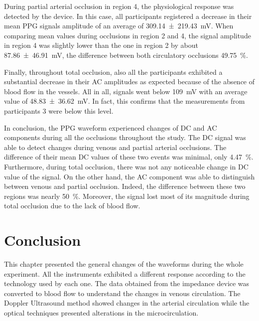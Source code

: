 During partial arterial occlusion in region 4, the physiological response was detected by the device. In this case, all participants registered a decrease in their mean PPG signals amplitude of an average of \SI{309.14(21943)}{\milli\volt}. When comparing mean values during occlusions in region 2 and 4, the signal amplitude in region 4 was slightly lower than the one in region 2 by about \SI{87.86(4691)}{\milli\volt}, the difference between both circulatory occlusions \SI{49.75}{\percent}.

Finally, throughout total occlusion, also all the participants exhibited a substantial decrease in their AC amplitudes as expected because of the absence of blood flow in the vessels. All in all, signals went below \SI{109}{\milli\volt} with an average value of \SI{48.83(3662)}{\milli\volt}. In fact, this confirms that the measurements from participants 3 were below this level. 

In conclusion, the PPG waveform experienced changes of DC and AC components during all the occlusions throughout the study. The DC signal was able to detect changes during venous and partial arterial occlusions. The difference of their mean DC values of these two events was minimal, only \SI{4.47}{\percent}. Furthermore, during total occlusion, there was not any noticeable change in DC value of the signal.  On the other hand, the AC component was able to distinguish between venous and partial occlusion. Indeed, the difference between these two regions was nearly \SI{50}{\percent}. Moreover, the signal lost most of its magnitude during total occlusion due to the lack of blood flow.

\section{Conclusion}
\label{section comparison 5}
This chapter presented the general changes of the waveforms during the whole experiment. All the instruments exhibited a different response according to the technology used by each one. The data obtained from the impedance device was converted to blood flow to understand the changes in venous circulation. The Doppler Ultrasound method showed changes in the arterial circulation while the optical techniques presented alterations in the microcirculation. 

